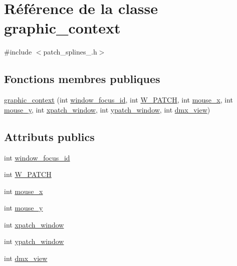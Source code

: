 \hypertarget{classgraphic__context}{\section{Référence de la classe graphic\+\_\+context}
\label{classgraphic__context}
}


{\ttfamily \#include $<$patch\+\_\+splines\+\_.\+h$>$}

\subsection*{Fonctions membres publiques}
\begin{DoxyCompactItemize}
\item 
\hyperlink{classgraphic__context_ac81331f894194151dc9f2f20f6eb86e6}{graphic\+\_\+context} (int \hyperlink{classgraphic__context_afb842574bef9200a343eae5ed25b6aea}{window\+\_\+focus\+\_\+id}, int \hyperlink{classgraphic__context_af8795c6d73bb4076febf90a4bed34cd7}{W\+\_\+\+P\+A\+T\+C\+H}, int \hyperlink{classgraphic__context_af9aa907f4c540927888920111f2a3890}{mouse\+\_\+x}, int \hyperlink{classgraphic__context_a72195ff30744dcb9c467cad5bda4e602}{mouse\+\_\+y}, int \hyperlink{classgraphic__context_a57a5bcca338d0b27c5014b9bde3f6e99}{xpatch\+\_\+window}, int \hyperlink{classgraphic__context_ae902bd96df3912441f3f5e99cd802fbf}{ypatch\+\_\+window}, int \hyperlink{classgraphic__context_abeabd1716cb7451605935b9191be65fb}{dmx\+\_\+view})
\end{DoxyCompactItemize}
\subsection*{Attributs publics}
\begin{DoxyCompactItemize}
\item 
int \hyperlink{classgraphic__context_afb842574bef9200a343eae5ed25b6aea}{window\+\_\+focus\+\_\+id}
\item 
int \hyperlink{classgraphic__context_af8795c6d73bb4076febf90a4bed34cd7}{W\+\_\+\+P\+A\+T\+C\+H}
\item 
int \hyperlink{classgraphic__context_af9aa907f4c540927888920111f2a3890}{mouse\+\_\+x}
\item 
int \hyperlink{classgraphic__context_a72195ff30744dcb9c467cad5bda4e602}{mouse\+\_\+y}
\item 
int \hyperlink{classgraphic__context_a57a5bcca338d0b27c5014b9bde3f6e99}{xpatch\+\_\+window}
\item 
int \hyperlink{classgraphic__context_ae902bd96df3912441f3f5e99cd802fbf}{ypatch\+\_\+window}
\item 
int \hyperlink{classgraphic__context_abeabd1716cb7451605935b9191be65fb}{dmx\+\_\+view}
\end{DoxyCompactItemize}



